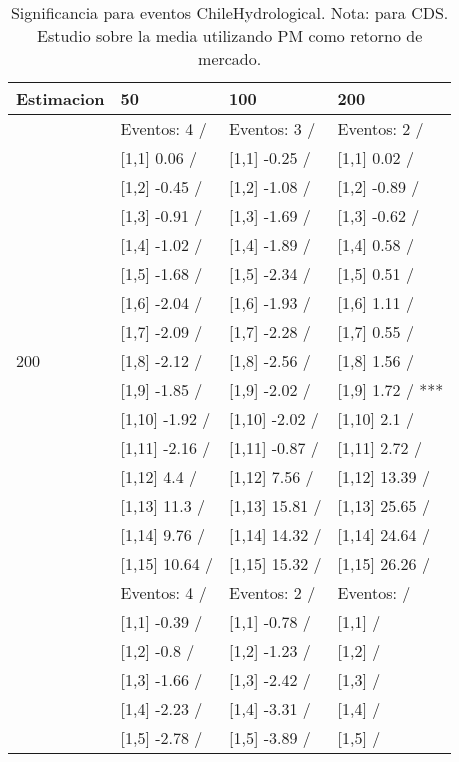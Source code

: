 \begin{table}

\caption{Significancia para eventos ChileHydrological. Nota: para CDS. Estudio sobre la media utilizando PM como retorno de mercado.}
\centering
\begin{tabular}[t]{llll}
\toprule
Estimacion & 50 & 100 & 200\\
\midrule
 & Eventos:  4 / & Eventos:  3 / & Eventos:  2 /\\
 & {}[1,1] 0.06  / & {}[1,1] -0.25  / & {}[1,1] 0.02  /\\
 & {}[1,2] -0.45  / & {}[1,2] -1.08  / & {}[1,2] -0.89  /\\
 & {}[1,3] -0.91  / & {}[1,3] -1.69  / & {}[1,3] -0.62  /\\
 & {}[1,4] -1.02  / & {}[1,4] -1.89  / & {}[1,4] 0.58  /\\
\addlinespace
 & {}[1,5] -1.68  / & {}[1,5] -2.34  / & {}[1,5] 0.51  /\\
 & {}[1,6] -2.04  / & {}[1,6] -1.93  / & {}[1,6] 1.11  /\\
 & {}[1,7] -2.09  / & {}[1,7] -2.28  / & {}[1,7] 0.55  /\\
200 & {}[1,8] -2.12  / & {}[1,8] -2.56  / & {}[1,8] 1.56  /\\
 & {}[1,9] -1.85  / & {}[1,9] -2.02  / & {}[1,9] 1.72  / ***\\
\addlinespace
 & {}[1,10] -1.92  / & {}[1,10] -2.02  / & {}[1,10] 2.1  /\\
 & {}[1,11] -2.16  / & {}[1,11] -0.87  / & {}[1,11] 2.72  /\\
 & {}[1,12] 4.4  / & {}[1,12] 7.56  / & {}[1,12] 13.39  /\\
 & {}[1,13] 11.3  / & {}[1,13] 15.81  / & {}[1,13] 25.65  /\\
 & {}[1,14] 9.76  / & {}[1,14] 14.32  / & {}[1,14] 24.64  /\\
\addlinespace
 & {}[1,15] 10.64  / & {}[1,15] 15.32  / & {}[1,15] 26.26  /\\
 & Eventos:  4 / & Eventos:  2 / & Eventos:   /\\
 & {}[1,1] -0.39  / & {}[1,1] -0.78  / & {}[1,1]  /\\
 & {}[1,2] -0.8  / & {}[1,2] -1.23  / & {}[1,2]  /\\
 & {}[1,3] -1.66  / & {}[1,3] -2.42  / & {}[1,3]  /\\
\addlinespace
 & {}[1,4] -2.23  / & {}[1,4] -3.31  / & {}[1,4]  /\\
 & {}[1,5] -2.78  / & {}[1,5] -3.89  / & {}[1,5]  /\\

\end{tabular}
\end{table}
